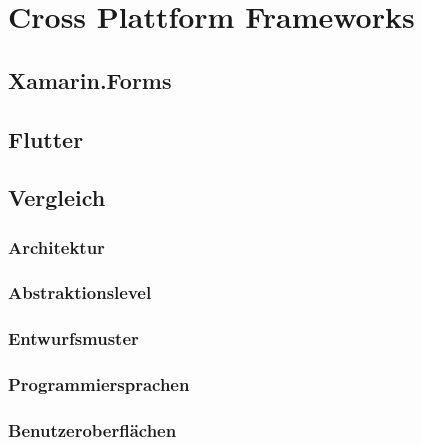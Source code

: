 \chapter{Cross Plattform Frameworks}

\section{Xamarin.Forms}
\section{Flutter}
\section{Vergleich}
\subsection{Architektur}
\subsection{Abstraktionslevel}
\subsection{Entwurfsmuster}
\subsection{Programmiersprachen}
\subsection{Benutzeroberflächen}

